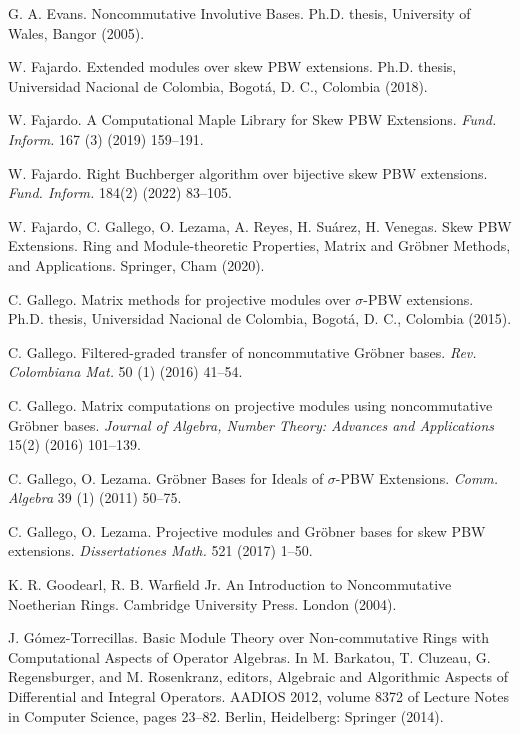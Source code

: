 \documentclass{amsart}
\theoremstyle{definition}
\theoremstyle{remark}
\numberwithin{equation}{section}
\begin{document}
\begin{thebibliography}{}
 G. A. Evans. Noncommutative Involutive Bases. Ph.D. thesis, University of Wales, Bangor (2005).

 W. Fajardo. Extended modules over skew {P}{B}{W} extensions. Ph.D. thesis, Universidad Nacional de Colombia, Bogot\'a, D. C.,  Colombia (2018).

 W. Fajardo. A {C}omputational {M}aple {L}ibrary for {S}kew {P}{B}{W}  {E}xtensions. {\em Fund. Inform.} 167 (3) (2019) 159--191.

 W. Fajardo. Right {B}uchberger algorithm over bijective skew {P}{B}{W} extensions. {\em Fund. Inform.} 184(2) (2022) 83--105.

 W. Fajardo, C. Gallego, O. Lezama, A. Reyes, H. Su\'arez, H. Venegas. Skew PBW Extensions. Ring and Module-theoretic Properties, Matrix and Gr\"obner Methods, and Applications. Springer, Cham (2020).

 C. Gallego. Matrix methods for projective modules over $\sigma$-{P}{B}{W} extensions. Ph.D. thesis, Universidad Nacional de Colombia, Bogot\'a, D. C., Colombia (2015).

 C. Gallego. Filtered-graded transfer of noncommutative {G}r\"obner bases. {\em Rev. Colombiana Mat.} 50 (1)  (2016) 41--54.

C. Gallego. Matrix computations on projective modules using noncommutative {G}r\"obner bases. {\em Journal of Algebra, Number Theory: Advances and Applications} 15(2) (2016) 101--139.

 C. Gallego, O. Lezama. Gr\"obner {B}ases for {I}deals of {$\sigma$}-{P}{B}{W} {E}xtensions. {\em Comm. Algebra} 39 (1) (2011) 50--75.

 C. Gallego, O. Lezama. Projective modules and {G}r\"obner bases for skew {P}{B}{W} extensions. {\em Dissertationes Math.} 521 (2017) 1--50.

 K. R. Goodearl, R. B. Warfield Jr. An {I}ntroduction to {N}oncommutative {N}oetherian {R}ings. Cambridge University Press. London (2004).

 J. G\'omez-Torrecillas. Basic {M}odule {T}heory over {N}on-commutative {R}ings with {C}omputational {A}spects of {O}perator {A}lgebras. In M. Barkatou, T. Cluzeau, G. Regensburger, and M. Rosenkranz, editors, Algebraic and Algorithmic Aspects of Differential and Integral Operators. AADIOS 2012, volume 8372 of Lecture Notes in Computer Science, pages 23--82. Berlin, Heidelberg: Springer (2014).


\end{thebibliography}
\end{document}
